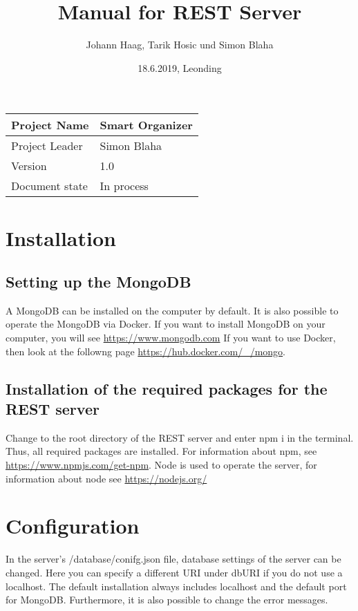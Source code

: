 \documentclass[12pt]{scrartcl}
\title{Manual for REST Server}
\author{Johann Haag, Tarik Hosic und Simon Blaha}
\date{18.6.2019, Leonding}
\begin{document}
    \maketitle
    \begin{flushleft}
    \begin{tabular}{|l|l|}
    \hline
    Project Name & Smart Organizer \\ \hline
    Project Leader & Simon Blaha \\ \hline
    Version & 1.0\\ \hline
    Document state & In process \\ \hline
    \end{tabular}
    \end{flushleft}

    \pagebreak
    \tableofcontents
    \pagebreak

    \section{Installation}
    \subsection{Setting up the MongoDB}
        A MongoDB can be installed on the computer by default. It is also possible to operate the MongoDB via Docker.
        If you want to install MongoDB on your computer, you will see \url{https://www.mongodb.com} 
        If you want to use Docker, then look at the followng page \url{https://hub.docker.com/_/mongo}.
    \subsection{Installation of the required packages for the REST server}
        Change to the root directory of the REST server and enter npm i in the terminal.
        Thus, all required packages are installed.
        For information about npm, see \url{https://www.npmjs.com/get-npm}.
        Node is used to operate the server, for information about node see \url{https://nodejs.org/}

    \section{Configuration}      
        In the server's /database/conifg.json file, database settings of the server can be changed.
        Here you can specify a different URI under dbURI if you do not use a localhost.
        The default installation always includes localhost and the default port for MongoDB.
        Furthermore, it is also possible to change the error messages.
\end{document}
